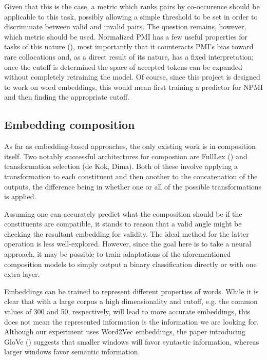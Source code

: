\documentclass[a4paper, 11pt]{scrartcl}
\begin{document}
Given that this is the case, a metric which ranks pairs by co-occurence should be applicable to this task, possibly allowing a simple threshold to be set in order to discriminate between valid and invalid pairs. The question remains, however, which metric should be used. Normalized PMI has a few useful properties for tasks of this nature (\cite{BoumaNPMI}), most importantly that it counteracts PMI's bias toward rare collocations and, as a direct result of its nature, has a fixed interpretation; once the cutoff is determined the space of accepted tokens can be expanded without completely retraining the model. Of course, since this project is designed to work on word embeddings, this would mean first training a predictor for NPMI and then finding the appropriate cutoff.

\subsection{Embedding composition}

As far as embedding-based approaches, the only existing work is in composition itself. Two notably successful architectures for compostion are FullLex (\cite{SocherFullLex}) and transformation selection (de Kok, Dima). Both of these involve applying a transformation to each constituent and then another to the concatenation of the outputs, the difference being in whether one or all of the possible transformations is applied.

Assuming one can accurately predict what the composition should be if the constituents are compatible, it stands to reason that a valid angle might be checking the resultant embedding for validity. The ideal method for the latter operation is less well-explored. However, since the goal here is to take a neural approach, it may be possible to train adaptations of the aforementioned composition models to simply output a binary classification directly or with one extra layer.

Embeddings can be trained to represent different properties of words. While it is clear that with a large corpus a high dimensionality and cutoff, e.g. the common values of 300 and 50, respectively, will lead to more accurate embeddings, this does not mean the represented information is the information we are looking for. Although our experiment uses Word2Vec embeddings, the paper introducing GloVe (\cite{PenningtonSocherManningGlove}) suggests that smaller windows will favor syntactic information, whereas larger windows favor semantic information.
\end{document}
